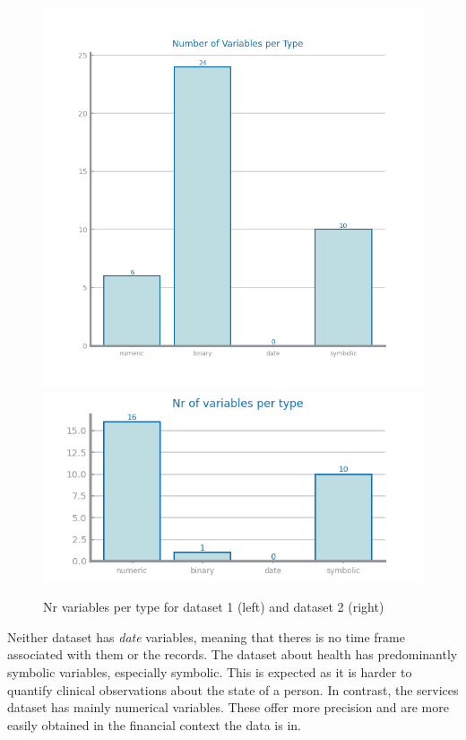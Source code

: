 \documentclass[10pt]{extarticle}
\begin{document}
\begin{figure}[H]
  \includegraphics[scale=0.70]{images/dataset1/data_profiling/CovidPos_variable_types.png}
  \centering\includegraphics[scale=0.7]{images/dataset2/data_profiling/Credit_Score_variable_types.png}
\caption{Nr variables per type for dataset 1 (left) and dataset 2 (right)}
\end{figure}
Neither dataset has \textit{date} variables, meaning that theres is no time frame associated with them or the records.
The dataset about health has predominantly symbolic variables, especially symbolic. This is expected as it is harder 
to quantify clinical observations about the state of a person. In contrast, the services dataset has mainly numerical variables.
These offer more precision and are more easily obtained in the financial context the data is in.
\end{document}
